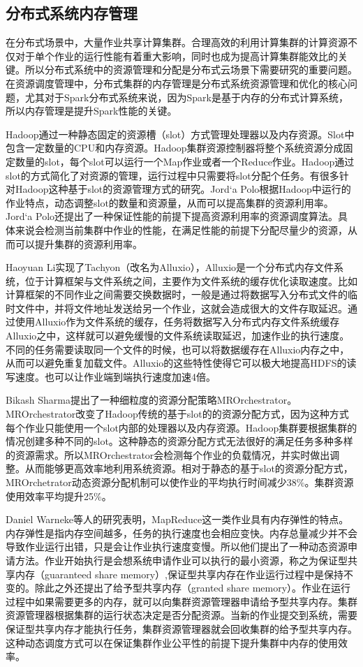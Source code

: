 \subsection{分布式系统内存管理}

在分布式场景中，大量作业共享计算集群。合理高效的利用计算集群的计算资源不仅对于单个作业的运行性能有着重大影响，同时也成为提高计算集群能效比的关键。所以分布式系统中的资源管理和分配是分布式云场景下需要研究的重要问题。在资源调度管理中，分布式集群的内存管理是分布式系统资源管理和优化的核心问题，尤其对于Spark分布式系统来说，因为Spark是基于内存的分布式计算系统，所以内存管理是提升Spark性能的关键。

Hadoop通过一种静态固定的资源槽（slot）方式管理处理器以及内存资源。Slot中包含一定数量的CPU和内存资源。Hadoop集群资源控制器将整个系统资源分成固定数量的slot，每个slot可以运行一个Map作业或者一个Reduce作业。Hadoop通过slot的方式简化了对资源的管理，运行过程中只需要将slot分配个任务。有很多针对Hadoop这种基于slot的资源管理方式的研究。Jord`a Polo根据Hadoop中运行的作业特点，动态调整slot的数量和资源量，从而可以提高集群的资源利用率。Jord`a Polo还提出了一种保证性能的前提下提高资源利用率的资源调度算法。具体来说会检测当前集群中作业的性能，在满足性能的前提下分配尽量少的资源，从而可以提升集群的资源利用率。

Haoyuan Li实现了Tachyon\cite{li2014tachyon}（改名为Alluxio\cite{li2018alluxio}），Alluxio是一个分布式内存文件系统，位于计算框架与文件系统之间，主要作为文件系统的缓存优化读取速度。比如计算框架的不同作业之间需要交换数据时，一般是通过将数据写入分布式文件的临时文件中，并将文件地址发送给另一个作业，这就会造成很大的文件存取延迟。通过使用Alluxio作为文件系统的缓存，任务将数据写入分布式内存文件系统缓存Alluxio之中，这样就可以避免缓慢的文件系统读取延迟，加速作业的执行速度。不同的任务需要读取同一个文件的时候，也可以将数据缓存在Alluxio内存之中，从而可以避免重复加载文件。Alluxio的这些特性使得它可以极大地提高HDFS的读写速度。也可以让作业端到端执行速度加速4倍。

Bikash Sharma提出了一种细粒度的资源分配策略MROrchestrator\cite{6253482}。MROrchestrator改变了Hadoop传统的基于slot的的资源分配方式，因为这种方式每个作业只能使用一个slot内部的处理器以及内存资源。Hadoop集群要根据集群的情况创建多种不同的slot。这种静态的资源分配方式无法很好的满足任务多种多样的资源需求。所以MROrchestrator会检测每个作业的负载情况，并实时做出调整。从而能够更高效率地利用系统资源。相对于静态的基于slot的资源分配方式，MROrchetrator动态资源分配机制可以使作业的平均执行时间减少38\%。集群资源使用效率平均提升25\%。

Daniel Warneke等人的研究表明\cite{5710902}，MapReduce这一类作业具有内存弹性的特点。内存弹性是指内存空间越多，任务的执行速度也会相应变快。内存总量减少并不会导致作业运行出错，只是会让作业执行速度变慢。所以他们提出了一种动态资源申请方法。作业开始执行是会想系统申请作业可以执行的最小资源，称之为保证型共享内存（guaranteed share memory）,保证型共享内存在作业运行过程中是保持不变的。除此之外还提出了给予型共享内存（granted share memory）。作业在运行过程中如果需要更多的内存，就可以向集群资源管理器申请给予型共享内存。集群资源管理器根据集群的运行状态决定是否分配资源。当新的作业提交到系统，需要保证型共享内存才能执行任务，集群资源管理器就会回收集群的给予型共享内存。这种动态调度方式可以在保证集群作业公平性的前提下提升集群中内存的使用效率。

